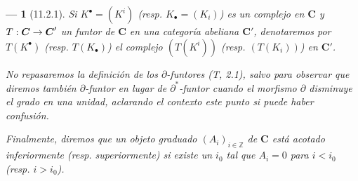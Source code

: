 \documentclass[10pt,oneside,openany]{book}
\theoremstyle{egaenv}\newtheorem*{env}{---}
\theoremstyle{egastatement}
\theoremstyle{egadescription}
\renewcommand{\to}{\mathchoice{\longrightarrow}{\rightarrow}{\rightarrow}{\rightarrow}}
\begin{document}
\begin{env}[11.2.1]
Si $K^\bullet=(K^i)$ (resp. $K_\bullet=(K_i)$) es un complejo en $\boldsymbol{C}$ y $T:\boldsymbol{C}\to\boldsymbol{C}'$ un funtor de $\boldsymbol{C}$ en una categoría abeliana $\boldsymbol{C}'$, denotaremos por $T(K^\bullet)$ (resp. $T(K_\bullet)$) el complejo $(T(K^i))$ (resp. $(T(K_i))$) en $\boldsymbol{C}'$.

No repasaremos la definición de los \emph{$\partial$-funtores} (T, 2.1), salvo para observar que diremos \emph{también} $\partial$-funtor en lugar de $\partial^*$-funtor cuando el morfismo $\partial$ disminuye el grado en una unidad, aclarando el contexto este punto si puede haber confusión.

Finalmente, diremos que un \emph{objeto graduado $(A_i)_{i\in\mathbb Z}$} de $\boldsymbol{C}$ está \emph{acotado inferiormente} (resp. \emph{superiormente}) si existe un $i_0$ tal que $A_i=0$ para $i<i_0$ (resp. $i>i_0$).
\end{env}
\end{document}
